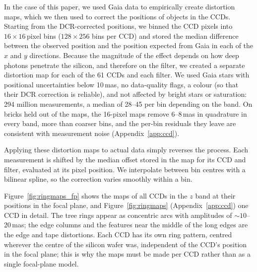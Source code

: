 \documentclass[usenatbib]{mnras}   %
\begin{document}
In the case of this paper, we used Gaia data to empirically create distortion maps, which we then used to correct the positions of objects in the CCDs. Starting from the DCR-corrected positions, we binned the CCD pixels into $16 \times 16$\,pixel bins ($128 \times 256$ bins per CCD) and stored the median difference between the observed position and the position expected from Gaia in each of the $x$ and $y$ directions. Because the magnitude of the effect depends on how deep photons penetrate the silicon, and therefore on the filter, we created a separate distortion map for each of the 61 CCDs and each filter. We used Gaia stars with positional uncertainties below 10\,mas, no data-quality flags, a colour (so that their DCR correction is reliable), and not affected by bright stars or saturation: 294 million measurements, a median of 28--45 per bin depending on the band. On bricks held out of the maps, the 16-pixel maps remove 6--8\,mas in quadrature in every band, more than coarser bins, and the per-bin residuals they leave are consistent with measurement noise (Appendix~\ref{app:ccd}).



Applying these distortion maps to actual data simply reverses the process. Each measurement is shifted by the median offset stored in the map for its CCD and filter, evaluated at its pixel position. We interpolate between bin centres with a bilinear spline, so the correction varies smoothly within a bin.

Figure~\ref{fig:ringmaps_fp} shows the maps of all CCDs in the $z$ band at their positions in the focal plane, and Figure~\ref{fig:ringmaps} (Appendix~\ref{app:ccd}) one CCD in detail. The tree rings appear as concentric arcs with amplitudes of $\sim\!10$--20\,mas; the edge columns and the features near the middle of the long edges are the edge and tape distortions. Each CCD has its own ring pattern, centred wherever the centre of the silicon wafer was, independent of the CCD's position in the focal plane; this is why the maps must be made per CCD rather than as a single focal-plane model.
\end{document}
